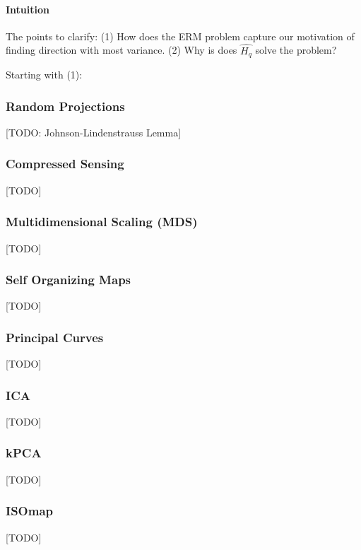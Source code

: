 \documentclass[12pt,a4paper]{article}
\theoremstyle{plain}
\theoremstyle{definition}
\newcommand{\projectMat}{H}
\newcommand{\rank}{q}
\begin{document}
\paragraph{Intuition}
The points to clarify: 
(1) How does the ERM problem capture our motivation of finding direction with most variance.
(2) Why is does $\hat{\projectMat_\rank}$ solve the problem?

Starting with (1):





\subsubsection{Random Projections}
[TODO: Johnson-Lindenstrauss Lemma]



\subsubsection{Compressed Sensing}
\label{sec:compressed_sensing}
[TODO]




\subsubsection{Multidimensional Scaling (MDS)}
[TODO]


\subsubsection{Self Organizing Maps}
[TODO]


\subsubsection{Principal Curves}
[TODO]

\subsubsection{ICA}
[TODO]

\subsubsection{kPCA}
[TODO]

\subsubsection{ISOmap}
[TODO]
\end{document}
